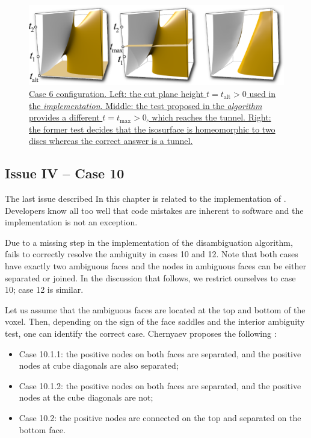 \begin{figure}[t]
     \centering
    \includegraphics[width=0.7\linewidth]{chapter4/figures/height-plane-problem.png}
     \caption{\href{http://dl.dropbox.com/u/8414964/C-MC33/webpage/figure7.html}{\label{interior_test}Case 6 configuration.
     Left: the cut plane height $t = t_{\mathrm{alt}} > 0$ used in the \mc{} \emph{implementation}. Middle: the test proposed in the \mc{} \emph{algorithm} provides a different $t = t_{\mathrm{max}}> 0$, which reaches the tunnel. Right: the former test decides that the isosurface is homeomorphic to two discs whereas the correct answer is a tunnel.}}
\end{figure}

\subsection{Issue IV -- Case 10}
\label{erros_cause:lewiner}

The last issue described In this chapter is related to the implementation of \mc{}.
Developers know all too well that code mistakes are inherent to software and the \mc{} implementation is not an exception.

Due to a missing step in the implementation of the disambiguation algorithm, \mc{} fails to correctly resolve the ambiguity in cases 10 and 12. Note that both cases have exactly two ambiguous faces and the nodes in ambiguous faces can be either separated or joined. In the discussion that follows, we restrict ourselves to case 10; case 12 is similar. 

Let us assume that the ambiguous faces are located at the top and bottom of the voxel. Then, depending on the sign of the face saddles and the interior ambiguity test, one can identify the correct case. Chernyaev proposes the following \cite{Chernyaev95marchingcubes}:
\begin{itemize}
\item Case 10.1.1: the positive nodes on both faces are separated, and the positive nodes at cube diagonals are also separated;
\item Case 10.1.2: the positive nodes on both faces are separated, and the positive nodes at the cube diagonals are not;
\item Case 10.2: the positive nodes are connected on the top and separated on the bottom face.
\end{itemize}

